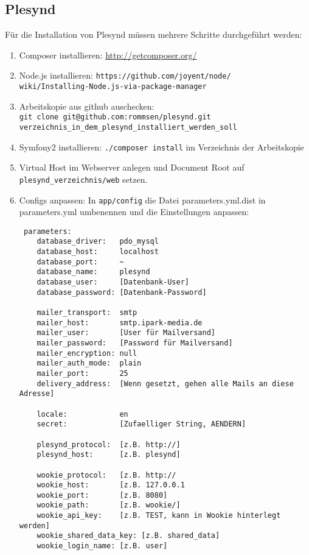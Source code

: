 \subsection{Plesynd}
Für die Installation von Plesynd müssen mehrere Schritte durchgeführt werden:
\begin{enumerate}
 \item Composer installieren: \url{http://getcomposer.org/}
 \item Node.js installieren: \texttt{https://github.com/joyent/node/}\\
 \texttt{wiki/Installing-Node.js-via-package-manager}
 \item Arbeitskopie aus github auschecken:\\ \texttt{git clone git@github.com:rommsen/plesynd.git}\\
 \texttt{verzeichnis\_in\_dem\_plesynd\_installiert\_werden\_soll}
 \item Symfony2 installieren: \texttt{./composer install} im Verzeichnis der Arbeitskopie
 \item Virtual Host im Webserver anlegen und Document Root auf \\
 \texttt{plesynd\_verzeichnis/web} setzen.
 \item Configs anpassen: In \texttt{app/config} die Datei parameters.yml.dist in parameters.yml umbenennen und die Einstellungen anpassen: 
 \begin{lstlisting}
 parameters:
    database_driver:   pdo_mysql
    database_host:     localhost
    database_port:     ~
    database_name:     plesynd
    database_user:     [Datenbank-User]
    database_password: [Datenbank-Password]

    mailer_transport:  smtp
    mailer_host:       smtp.ipark-media.de
    mailer_user:       [User für Mailversand]
    mailer_password:   [Password für Mailversand]
    mailer_encryption: null
    mailer_auth_mode:  plain
    mailer_port:       25
    delivery_address:  [Wenn gesetzt, gehen alle Mails an diese Adresse]

    locale:            en
    secret:            [Zufaelliger String, AENDERN]

    plesynd_protocol:  [z.B. http://] 
    plesynd_host:      [z.B. plesynd]

    wookie_protocol:   [z.B. http://
    wookie_host:       [z.B. 127.0.0.1
    wookie_port:       [z.B. 8080]
    wookie_path:       [z.B. wookie/]
    wookie_api_key:    [z.B. TEST, kann in Wookie hinterlegt werden]
    wookie_shared_data_key: [z.B. shared_data]
    wookie_login_name: [z.B. user]
 \end{lstlisting}


\end{enumerate}
